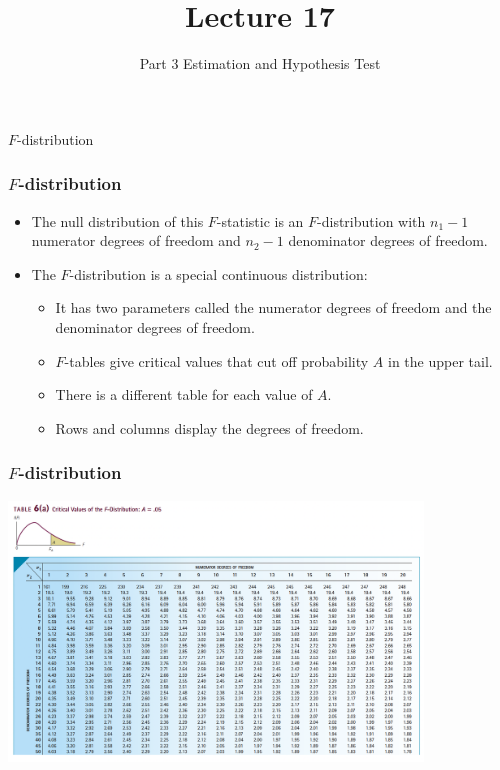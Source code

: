 \documentclass[12pt]{beamer}
\title[ECON2843]{Lecture 17}
\subtitle{Part 3 Estimation and Hypothesis Test}
\date{}
\begin{document}
	\begin{frame}
		\titlepage
	\end{frame}
	\begin{frame}
		\vspace{1cm}
		\centering
		{\color{blue}\large $F$-distribution}
	\end{frame}

	\begin{frame}
		\frametitle{$F$-distribution}
		
		\begin{itemize}[label={\color{blue}$\blacktriangleright$}]
			\item The null distribution of this $F$-statistic is an $F$-distribution with $n_1 - 1$ numerator degrees of freedom and $n_2 - 1$ denominator degrees of freedom.
			\item The $F$-distribution is a special continuous distribution:
			\begin{itemize}[label={\color{blue}$\blacktriangleright$}]
				\item It has two parameters called the numerator degrees of freedom and the denominator degrees of freedom.
				\item $F$-tables give critical values that cut off probability $A$ in the upper tail.
				\item There is a different table for each value of $A$.
				\item Rows and columns display the degrees of freedom.
			\end{itemize}
		\end{itemize}
		
	\end{frame}
		\begin{frame}
		\frametitle{$F$-distribution}
\centering
\includegraphics[width=11cm]{fstat.png}	
		
	\end{frame}
\end{document}
